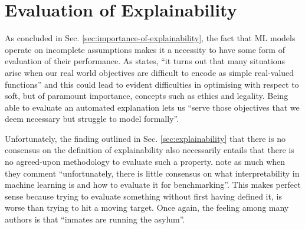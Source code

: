 \section{Evaluation of Explainability}
As concluded in Sec. \ref{sec:importance-of-explainability}, the fact that ML models operate on incomplete assumptions makes it a necessity to have some form of evaluation of their performance.
As \cite{Lipton2016} states, \enquote{it turns out that many situations arise when our real world objectives are difficult to encode as simple real-valued functions} and this could lead to evident difficulties in optimising with respect to soft, but of paramount importance, concepts such as ethics and legality.
Being able to evaluate an automated explanation lets us \enquote{serve those objectives that we deem necessary but struggle to model formally}.

Unfortunately, the finding outlined in Sec. \ref{sec:explainability} that there is no consensus on the definition of explainability also necessarily entails that there is no agreed-upon methodology to evaluate such a property.
\cite{doshi2017towards} note as much when they comment \enquote{unfortunately, there is little consensus on what interpretability in machine learning is and how to evaluate it for benchmarking}.
This makes perfect sense because trying to evaluate something without first having defined it, is worse than trying to hit a moving target.
Once again, the feeling among many authors is that \enquote{inmates are running the asylum}.

